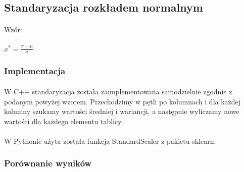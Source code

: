 \documentclass[a4paper,11pt]{article}
\begin{document}
\paragraph{}
\newpage

\subsection{Standaryzacja rozkładem normalnym} 
\paragraph{} Wzór:
\paragraph{}$x^*=\frac{x-\mu}{\sigma}$
\subsubsection{Implementacja} 
\paragraph{}W C++ standaryzacja została zaimplementowana samodzielnie zgodnie z podanym powyżej wzorem. Przechodzimy w pętli po kolumnach i dla każdej kolumny szukamy wartości średniej i wariancji, a następnie wyliczamy nowe wartości dla każdego elementu tablicy.

\paragraph{}W Pythonie użyta została funkcja StandardScaler z pakietu sklearn.

\subsubsection{Porównanie wyników} 
\end{document}
